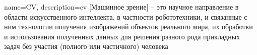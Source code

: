 \makeglossaries

{
    name=CV,
    description={cv [Машинное зрение] -- это научное направление в области искусственного интеллекта, в частности робототехники, и связанные с ним технологии получения изображений объектов реального мира, их обработки и использования полученных данных для решения разного рода прикладных задач без участия (полного или частичного) человека}
}
